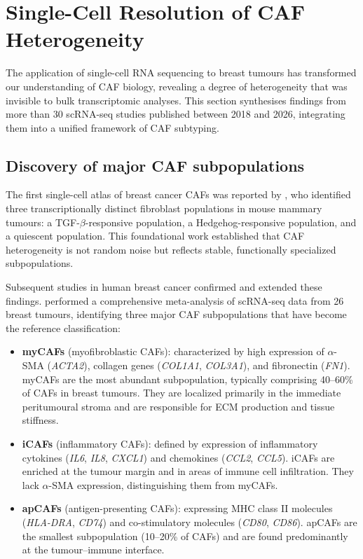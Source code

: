 \section{Single-Cell Resolution of CAF Heterogeneity}
\label{sec:heterogeneity}

The application of single-cell RNA sequencing to breast tumours has transformed our understanding of CAF biology, revealing a degree of heterogeneity that was invisible to bulk transcriptomic analyses. This section synthesises findings from more than 30 scRNA-seq studies published between 2018 and 2026, integrating them into a unified framework of CAF subtyping.

\subsection{Discovery of major CAF subpopulations}

The first single-cell atlas of breast cancer CAFs was reported by \citet{bartoschek2018spatially}, who identified three transcriptionally distinct fibroblast populations in mouse mammary tumours: a TGF-$\beta$-responsive population, a Hedgehog-responsive population, and a quiescent population. This foundational work established that CAF heterogeneity is not random noise but reflects stable, functionally specialized subpopulations.

Subsequent studies in human breast cancer confirmed and extended these findings. \citet{erve2024} performed a comprehensive meta-analysis of scRNA-seq data from 26 breast tumours, identifying three major CAF subpopulations that have become the reference classification:

\begin{itemize}
  \item \textbf{myCAFs} (myofibroblastic CAFs): characterized by high expression of $\alpha$-SMA (\textit{ACTA2}), collagen genes (\textit{COL1A1}, \textit{COL3A1}), and fibronectin (\textit{FN1}). myCAFs are the most abundant subpopulation, typically comprising 40--60\% of CAFs in breast tumours. They are localized primarily in the immediate peritumoural stroma and are responsible for ECM production and tissue stiffness.
  \item \textbf{iCAFs} (inflammatory CAFs): defined by expression of inflammatory cytokines (\textit{IL6}, \textit{IL8}, \textit{CXCL1}) and chemokines (\textit{CCL2}, \textit{CCL5}). iCAFs are enriched at the tumour margin and in areas of immune cell infiltration. They lack $\alpha$-SMA expression, distinguishing them from myCAFs.
  \item \textbf{apCAFs} (antigen-presenting CAFs): expressing MHC class II molecules (\textit{HLA-DRA}, \textit{CD74}) and co-stimulatory molecules (\textit{CD80}, \textit{CD86}). apCAFs are the smallest subpopulation (10--20\% of CAFs) and are found predominantly at the tumour--immune interface.
\end{itemize}

